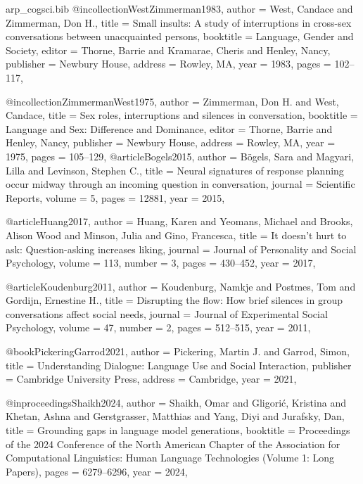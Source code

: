 \begin{filecontents*}[overwrite]{arp_cogsci.bib}
@incollection{WestZimmerman1983,
  author    = {West, Candace and Zimmerman, Don H.},
  title     = {Small insults: A study of interruptions in cross-sex conversations between unacquainted persons},
  booktitle = {Language, Gender and Society},
  editor    = {Thorne, Barrie and Kramarae, Cheris and Henley, Nancy},
  publisher = {Newbury House},
  address   = {Rowley, MA},
  year      = {1983},
  pages     = {102--117},
}

@incollection{ZimmermanWest1975,
  author    = {Zimmerman, Don H. and West, Candace},
  title     = {Sex roles, interruptions and silences in conversation},
  booktitle = {Language and Sex: Difference and Dominance},
  editor    = {Thorne, Barrie and Henley, Nancy},
  publisher = {Newbury House},
  address   = {Rowley, MA},
  year      = {1975},
  pages     = {105--129},
}
@article{Bogels2015,
  author  = {B{\"o}gels, Sara and Magyari, Lilla and Levinson, Stephen C.},
  title   = {Neural signatures of response planning occur midway through an incoming question in conversation},
  journal = {Scientific Reports},
  volume  = {5},
  pages   = {12881},
  year    = {2015},
}

@article{Huang2017,
  author  = {Huang, Karen and Yeomans, Michael and Brooks, Alison Wood and Minson, Julia and Gino, Francesca},
  title   = {It doesn't hurt to ask: Question-asking increases liking},
  journal = {Journal of Personality and Social Psychology},
  volume  = {113},
  number  = {3},
  pages   = {430--452},
  year    = {2017},
}

@article{Koudenburg2011,
  author  = {Koudenburg, Namkje and Postmes, Tom and Gordijn, Ernestine H.},
  title   = {Disrupting the flow: How brief silences in group conversations affect social needs},
  journal = {Journal of Experimental Social Psychology},
  volume  = {47},
  number  = {2},
  pages   = {512--515},
  year    = {2011},
}

@book{PickeringGarrod2021,
  author    = {Pickering, Martin J. and Garrod, Simon},
  title     = {Understanding Dialogue: Language Use and Social Interaction},
  publisher = {Cambridge University Press},
  address   = {Cambridge},
  year      = {2021},
}

@inproceedings{Shaikh2024,
  author    = {Shaikh, Omar and Gligori{\'c}, Kristina and Khetan, Ashna and Gerstgrasser, Matthias and Yang, Diyi and Jurafsky, Dan},
  title     = {Grounding gaps in language model generations},
  booktitle = {Proceedings of the 2024 Conference of the North American Chapter of the Association for Computational Linguistics: Human Language Technologies (Volume 1: Long Papers)},
  pages     = {6279--6296},
  year      = {2024},
}


\end{filecontents*}
